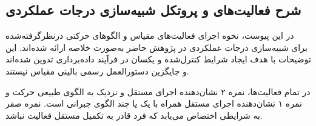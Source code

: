 
	\subsection{شرح فعالیت‌های  و پروتکل شبیه‌سازی درجات عملکردی}
	\label{app:nsaa_protocol}
	
	در این پیوست، نحوه اجرای فعالیت‌های مقیاس
	و الگوهای حرکتی درنظرگرفته‌شده برای شبیه‌سازی درجات عملکردی در پژوهش حاضر به‌صورت خلاصه ارائه شده‌اند. این توضیحات با هدف ایجاد شرایط کنترل‌شده و یکسان در فرآیند داده‌برداری تدوین شده‌اند و جایگزین دستورالعمل رسمی بالینی مقیاس
	نیستند.
	
	در تمام فعالیت‌ها، نمره ۲ نشان‌دهنده اجرای مستقل و نزدیک به الگوی طبیعی حرکت و نمره ۱ نشان‌دهنده اجرای مستقل همراه با یک یا چند الگوی جبرانی است. نمره صفر به شرایطی اختصاص می‌یابد که فرد قادر به تکمیل مستقل فعالیت نباشد.
	
